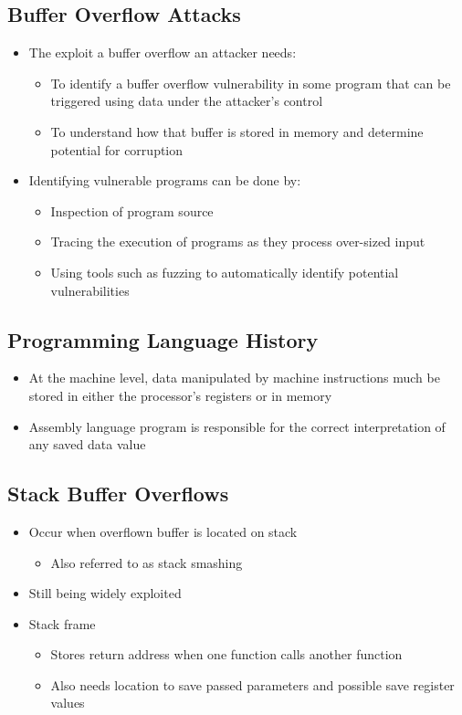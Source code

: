 \documentclass[11pt]{article}
\begin{document}
\subsection{Buffer Overflow Attacks}
\label{sec:org14872e3}
\begin{itemize}
\item The exploit a buffer overflow an attacker needs:
\begin{itemize}
\item To identify a buffer overflow vulnerability in some program that can be triggered using data under the attacker's control
\item To understand how that buffer is stored in memory and determine potential for corruption
\end{itemize}
\item Identifying vulnerable programs can be done by:
\begin{itemize}
\item Inspection of program source
\item Tracing the execution of programs as they process over-sized input
\item Using tools such as fuzzing to automatically identify potential vulnerabilities
\end{itemize}
\end{itemize}
\subsection{Programming Language History}
\label{sec:orga46b67a}
\begin{itemize}
\item At the machine level, data manipulated by machine instructions much be stored in either the processor's registers or in memory
\item Assembly language program is responsible for the correct interpretation of any saved data value
\end{itemize}
\subsection{Stack Buffer Overflows}
\label{sec:orgff628e7}
\begin{itemize}
\item Occur when overflown buffer is located on stack
\begin{itemize}
\item Also referred to as stack smashing
\end{itemize}
\item Still being widely exploited
\item Stack frame
\begin{itemize}
\item Stores return address when one function calls another function
\item Also needs location to save passed parameters and possible save register values
\end{itemize}
\end{itemize}
\end{document}
